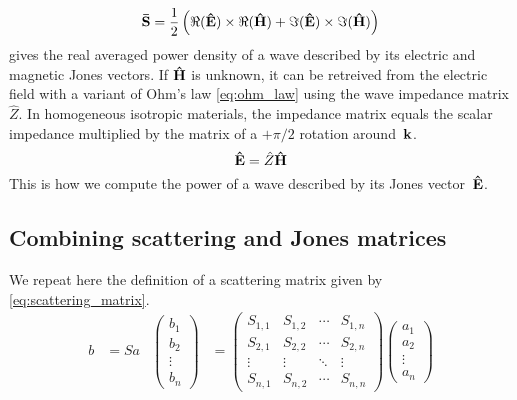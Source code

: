 \begin{equation}
    \mathbf{\bar{S}} = \frac{1}{2}
    \left(
        \Re(\mathbf{\hat{E}}) \times \Re(\mathbf{\hat{H}}) + 
        \Im(\mathbf{\hat{E}}) \times \Im(\mathbf{\hat{H}})
    \right)
    \label{eq:poynting_from_phasors}
\end{equation}
 gives the real averaged power density of a wave described by its electric and magnetic Jones vectors.
If $\mathbf{\hat{H}}$ is unknown, it can be retreived from the electric field with a variant of Ohm's law \eqref{eq:ohm_law} using the wave impedance matrix $\hat{Z}$.
In homogeneous isotropic materials, the impedance matrix equals the scalar impedance multiplied by the matrix of a $+\pi/2$ rotation around~$\mathbf{k}$.
\begin{equation}
    \mathbf{\hat{E}} = \hat{Z} \mathbf{\hat{H}} \label{eq:ohm_law}
\end{equation}
This is how we compute the power of a wave described by its Jones vector~$\mathbf{\hat{E}}$.



\subsection{Combining scattering and Jones matrices}
We repeat here the definition of a scattering matrix given by \vref{eq:scattering_matrix}.
\begin{align*}
    b &= S a
    &
    \begin{pmatrix}
        b_1\\
        b_2\\
        \vdots\\
        b_n
    \end{pmatrix}
    &=
    \begin{pmatrix}
        S_{1, 1} & S_{1, 2} & \cdots & S_{1, n} \\
        S_{2, 1} & S_{2, 2} & \cdots & S_{2, n} \\
        \vdots   & \vdots   & \ddots & \vdots   \\
        S_{n, 1} & S_{n, 2} & \cdots & S_{n, n}
    \end{pmatrix}
    \begin{pmatrix}
        a_1\\
        a_2\\
        \vdots\\
        a_n
    \end{pmatrix}
\end{align*}

